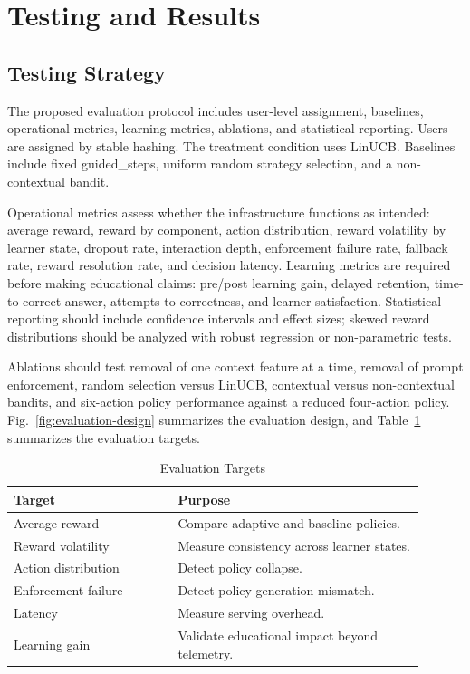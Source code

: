 \documentclass[conference]{IEEEtran}
\begin{document}
\section{Testing and Results}

\subsection{Testing Strategy}

The proposed evaluation protocol includes user-level assignment, baselines, operational metrics, learning metrics, ablations, and statistical reporting. Users are assigned by stable hashing. The treatment condition uses LinUCB. Baselines include fixed guided\_steps, uniform random strategy selection, and a non-contextual bandit.

Operational metrics assess whether the infrastructure functions as intended: average reward, reward by component, action distribution, reward volatility by learner state, dropout rate, interaction depth, enforcement failure rate, fallback rate, reward resolution rate, and decision latency. Learning metrics are required before making educational claims: pre/post learning gain, delayed retention, time-to-correct-answer, attempts to correctness, and learner satisfaction. Statistical reporting should include confidence intervals and effect sizes; skewed reward distributions should be analyzed with robust regression or non-parametric tests.

Ablations should test removal of one context feature at a time, removal of prompt enforcement, random selection versus LinUCB, contextual versus non-contextual bandits, and six-action policy performance against a reduced four-action policy. Fig.~\ref{fig:evaluation-design} summarizes the evaluation design, and Table~\ref{tab:evaluation-targets} summarizes the evaluation targets.

\begin{table}[htbp]
\caption{Evaluation Targets}
\label{tab:evaluation-targets}
\centering
\begin{tabular}{p{0.36\linewidth}p{0.54\linewidth}}
\toprule
\textbf{Target} & \textbf{Purpose} \\
\midrule
Average reward & Compare adaptive and baseline policies. \\
Reward volatility & Measure consistency across learner states. \\
Action distribution & Detect policy collapse. \\
Enforcement failure & Detect policy-generation mismatch. \\
Latency & Measure serving overhead. \\
Learning gain & Validate educational impact beyond telemetry. \\
\bottomrule
\end{tabular}
\end{table}
\end{document}
